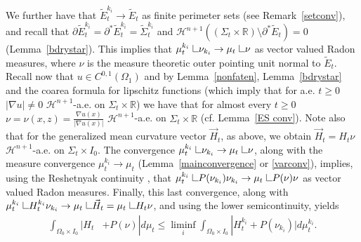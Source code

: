 \documentclass[11pt]{amsart}
\def\R{\mathbb{R}}
\def\H{\mathcal{H}}
\def\wt{\widetilde}
\def\res{\hbox{ {\vrule height .25cm}{\leaders\hrule\hskip.2cm}}\hskip5.0\mu}
\begin{document}
We further have that $\wt E_t^{k_i}\to \wt E_t$ as finite perimeter sets (see Remark~\ref{setconv}), and recall that 
$\partial \wt E^{k_i}_t=\partial^*  \wt E^{k_i}_t=\wt\Sigma^{k_i}_t$ and  $\H^{n+1}((\Sigma_t\times\R)\setminus\partial^*\wt E_t)=0$ (Lemma~\ref{bdrystar}).
This implies that $\mu^{k_i}_t\res\nu_{k_i}\to\mu_t\res  \nu$ as vector valued Radon measures, where $\nu$ is the measure theoretic outer pointing unit normal to $\wt E_t$. Recall now that $u\in C^{0,1}(\Omega_1)$ and by Lemma~\ref{nonfaten}, Lemma~\ref{bdrystar} and the coarea formula for lipschitz functions (which imply that for a.e. $t\ge0$ $|\nabla u|\ne 0$ $\H^{n+1}$-a.e. on $\Sigma_t\times\R$) we have that for almost every $t\ge 0$ $\nu=\nu(x,z)=\frac{\nabla u(x)}{|\nabla u(x)|}$ $\H^{n+1}$-a.e. on $\Sigma_t\times\R$ (cf. Lemma~\ref{ES conv}). Note also that for the generalized mean curvature vector $\vec H_t$, as above, we obtain
 $\vec H_t= H_t\nu$ $\H^{n+1}$-a.e. on $\Sigma_t\times I_0$.  
The convergence  $\mu^{k_i}_t\res\nu_{k_i}\to\mu_t\res  \nu$,  along with the measure convergence $\mu^{k_i}_t\to\mu_t$ (Lemma~\ref{mainconvergence} or \eqref{varconv}), implies, using the Reshetnyak continuity  \cite[Theorem 2.39]{AFP}, that $\mu^{k_i}_t\res  P(\nu_{k_i})\nu_{k_i}\to\mu_t\res  P(\nu) \nu$ as vector valued Radon measures. 
Finally, this last convergence, along with $\mu^{k_i}_t\res H_t^{k_i}\nu_{k_i}\to\mu_t\res \vec H_t=\mu_t\res H_t\nu$, and using the lower semicontinuity, yields
\begin{equation}\label{H+Plimit}
\begin{split}
 \int_{\Omega_0\times I_0}|H_t&+P(\nu)|d\mu_t  \le\liminf_i\int_{\Omega_0\times I_0}|H^{k_i}_t+ P(\nu_{k_i})|d\mu_t^{k_i}.
  \end{split}
\end{equation}
\end{document}
